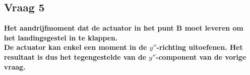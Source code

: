 \documentclass[a4paper,10pt]{article}
\begin{document}
\subsection{Vraag 5}
\textbf{Het aandrijfmoment dat de actuator in het punt B moet leveren om het landingsgestel in te klappen.}\\
\textbf{De actuator kan enkel een moment in de $y''$-richting uitoefenen. Het resultaat is dus het tegengestelde van de $y''$-component van de vorige vraag.}
\end{document}
